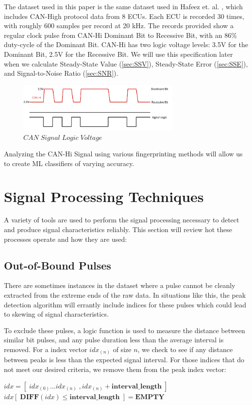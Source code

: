\documentclass[conference]{IEEEtran}
\begin{document}
The dataset used in this paper is the same dataset used in Hafeez et. al. \cite{hafeez2019}, which includes CAN-High protocol data from 8 ECUs. Each ECU is recorded 30 times, with roughly 600 samples per record at 20 kHz. The records provided show a regular clock pulse from CAN-Hi Dominant Bit to Recessive Bit, with an 86\% duty-cycle of the Dominant Bit. CAN-Hi has two logic voltage levels: 3.5V for the Dominant Bit, 2.5V for the Recessive Bit. We will use this specification later when we calculate Steady-State Value (\ref{sec:SSV}), Steady-State Error (\ref{sec:SSE}), and Signal-to-Noise Ratio (\ref{sec:SNR}).

\begin{figure}[htb]
\centering
\includegraphics[width=3.2in]{figures/02_can_hi.png}
\caption{$CAN  \; Signal \; Logic  \; Voltage$}
\label{fig:CANBitLogic}
\end{figure}

Analyzing the CAN-Hi Signal using various fingerprinting methods will allow us to create ML classifiers of varying accuracy.



\section{Signal Processing Techniques}

A variety of tools are used to perform the signal processing necessary to detect and produce signal characteristics reliably. This section will review hot these processes operate and how they are used:

\subsection{Out-of-Bound Pulses}  \label{sec:OoBP}
There are sometimes instances in the dataset where a pulse cannot be cleanly extracted from the extreme ends of the raw data. In situations like this, the peak detection algorithm will errantly include indices for these pulses which could lead to skewing of signal characteristics.

To exclude these pulses, a logic function is used to measure the distance between similar bit pulses, and any pulse duration less than the average interval is removed. For a index vector $idx_{(n)}$ of size $n$, we check to see if any distance between peaks is less than the expected signal interval. For those indices that do not meet our desired criteria, we remove them from the peak index vector:
\medbreak
\begin{algorithmic}
\STATE $idx = [\;idx_{(0)} ... idx_{(n)}\;, idx_{(n)} + \textbf{interval\_length}\;]$
\medbreak
\STATE $idx[\;\textbf{DIFF}(idx) \leq \textbf{interval\_length}\;] = \textbf{EMPTY}$
\end{algorithmic}
\end{document}
